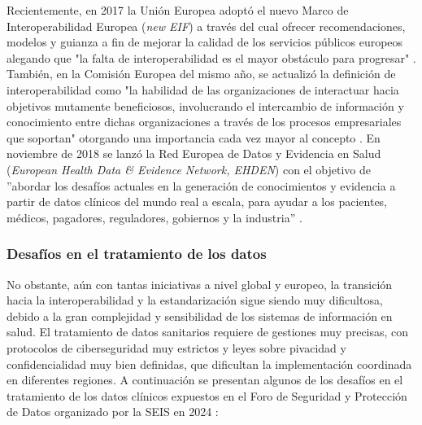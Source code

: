 \begin{enumerate}[label=\alph*.]
    Recientemente, en 2017 la Unión Europea adoptó el nuevo Marco de Interoperabilidad Europea (\textit{new EIF})  a través del cual ofrecer recomendaciones, modelos y guianza a fin de mejorar la calidad de los servicios públicos europeos alegando que "la falta de interoperabilidad es el mayor obstáculo para progresar" \cite{kouroubali2019new}. También, en la Comisión Europea del mismo año, se actualizó la definición de interoperabilidad como "la habilidad de las organizaciones de interactuar hacia objetivos mutamente beneficiosos, involucrando el intercambio de información y conocimiento entre dichas organizaciones a través de los procesos empresariales que soportan" otorgando una importancia cada vez mayor al concepto \cite{katehakis2019framework}\cite{CEU2017eif} \cite{casiano2022towards}. En noviembre de 2018 se lanzó la Red Europea de Datos y Evidencia en Salud (\textit{European Health Data \& Evidence Network, EHDEN}) con el objetivo de ''abordar los desafíos actuales en la generación de conocimientos y evidencia a partir de datos clínicos del mundo real a escala, para ayudar a los pacientes, médicos, pagadores, reguladores, gobiernos y la industria'' \cite{ehden}.

\end{enumerate}

\subsubsection{Desafíos en el tratamiento de los datos}

No obstante, aún con tantas iniciativas a nivel global y europeo, la transición hacia la interoperabilidad y la estandarización sigue siendo muy dificultosa, debido a la gran complejidad y sensibilidad de los sistemas de información en salud. El tratamiento de datos sanitarios requiere de gestiones muy precisas, con protocolos de ciberseguridad muy estrictos y leyes sobre pivacidad y confidencialidad muy bien definidas, que dificultan la implementación coordinada en diferentes regiones. A continuación se presentan algunos de los desafíos en el tratamiento de los datos clínicos expuestos en el Foro de Seguridad y Protección de Datos organizado por la SEIS en 2024 \cite{SEIS2024tercera} \cite{SEIS2024octava}:

